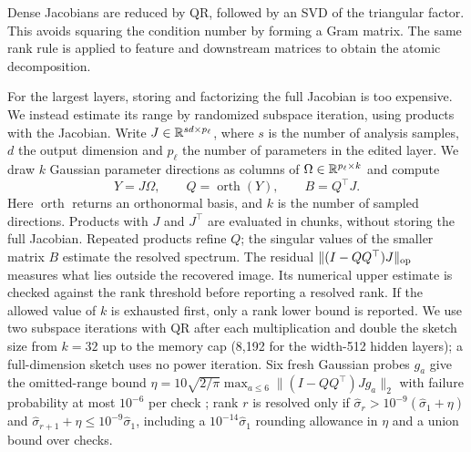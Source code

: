 Dense Jacobians are reduced by QR, followed by an SVD of the triangular factor. This avoids squaring the condition number by forming a Gram matrix. The same rank rule is applied to feature and downstream matrices to obtain the atomic decomposition.

For the largest layers, storing and factorizing the full Jacobian is too expensive. We instead estimate its range by randomized subspace iteration, using products with the Jacobian. Write $J\in\mathbb R^{sd\times p_\ell}$, where $s$ is the number of analysis samples, $d$ the output dimension and $p_\ell$ the number of parameters in the edited layer. We draw $k$ Gaussian parameter directions as columns of $\Omega\in\mathbb R^{p_\ell\times k}$ and compute
\[
 Y=J\Omega,\qquad Q=\operatorname{orth}(Y),\qquad B=Q^\top J.
\]
Here $\operatorname{orth}$ returns an orthonormal basis, and $k$ is the number of sampled directions. Products with $J$ and $J^\top$ are evaluated in chunks, without storing the full Jacobian. Repeated products refine $Q$; the singular values of the smaller matrix $B$ estimate the resolved spectrum. The residual $\|(I-QQ^\top)J\|_{\rm op}$ measures what lies outside the recovered image. Its numerical upper estimate is checked against the rank threshold before reporting a resolved rank. If the allowed value of $k$ is exhausted first, only a rank lower bound is reported. We use two subspace iterations with QR after each multiplication and double the sketch size from $k=32$ up to the memory cap (8,192 for the width-512 hidden layers); a full-dimension sketch uses no power iteration. Six fresh Gaussian probes $g_a$ give the omitted-range bound $\eta=10\sqrt{2/\pi}\max_{a\le6}\|(I-QQ^\top)Jg_a\|_2$ with failure probability at most $10^{-6}$ per check \citep[Lemma 4.1]{halko2011randomized}; rank $r$ is resolved only if $\hat\sigma_r>10^{-9}(\hat\sigma_1+\eta)$ and $\hat\sigma_{r+1}+\eta\le10^{-9}\hat\sigma_1$, including a $10^{-14}\hat\sigma_1$ rounding allowance in $\eta$ and a union bound over checks.

